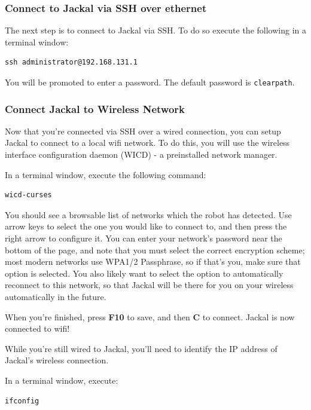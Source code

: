 \documentclass[]{clearpath-latex/clearpath-manual}
\begin{document}
\subsubsection{Connect to Jackal via SSH over ethernet}

The next step is to connect to Jackal via SSH.  To do so execute the following in a terminal window:

\begin{lstlisting}
ssh administrator@192.168.131.1
\end{lstlisting}

You will be promoted to enter a password.  The default password is \lstinline{clearpath}.

\subsubsection{Connect Jackal to Wireless Network}

Now that you're connected via SSH over a wired connection, you can setup Jackal to connect to a local wifi network.  To do this, you will use the wireless interface configuration daemon (WICD) - a preinstalled network manager.

In a terminal window, execute the following command:

\begin{lstlisting}
wicd-curses
\end{lstlisting}

You should see a browsable list of networks which the robot has detected. Use arrow keys to select the one you would like to connect to, and then press the right arrow to configure it. You can enter your network’s password near the bottom of the page, and note that you must select the correct encryption scheme; most modern networks use WPA1/2 Passphrase, so if that’s you, make sure that option is selected. You also likely want to select the option to automatically reconnect to this network, so that Jackal will be there for you on your wireless automatically in the future.

When you’re finished, press \textbf{F10} to save, and then \textbf{C} to connect.  Jackal is now connected to wifi!

While you're still wired to Jackal, you'll need to identify the IP address of Jackal's wireless connection.

In a terminal window, execute:

\begin{lstlisting}
ifconfig
\end{lstlisting}
\end{document}
